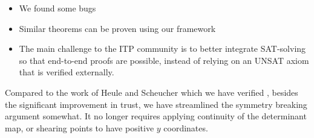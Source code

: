 \begin{itemize}
    \item We found some bugs 
    \item Similar theorems can be proven using our framework
    \item The main challenge to the ITP community is to better integrate SAT-solving so that end-to-end proofs are possible, instead of relying on an UNSAT axiom that is verified externally.
\end{itemize}

Compared to the work of Heule and Scheucher which we have verified \cite{emptyHexagonNumber},
besides the significant improvement in trust,
we have streamlined the symmetry breaking argument somewhat.
It no longer requires applying continuity of the determinant map,
or shearing points to have positive $y$ coordinates.
